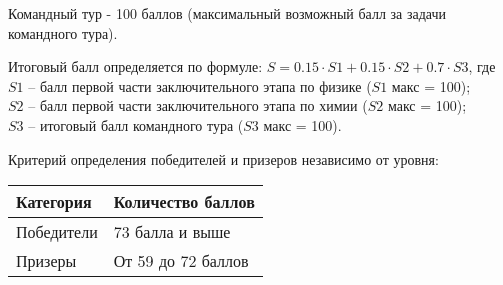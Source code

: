 Командный тур - 100 баллов (максимальный возможный балл за задачи командного
тура).

Итоговый балл определяется по формуле: $S = 0.15 \cdot S1 + 0.15 \cdot S2 + 0.7 \cdot S3$, где\\
$S1$ – балл первой части заключительного этапа по физике ($S1$ макс = 100);\\
$S2$ – балл первой части заключительного этапа по химии ($S2$ макс = 100);\\
$S3$ – итоговый балл командного тура ($S3$ макс = 100).

Критерий определения победителей и призеров независимо от уровня:
\begin{center}
    \begin{tabular}{|l|l|}
        \hline
        Категория&Количество баллов\\
        \hline
        Победители&73 балла и выше\\
        \hline
        Призеры&От 59 до 72 баллов\\
        \hline
    \end{tabular}
\end{center}
